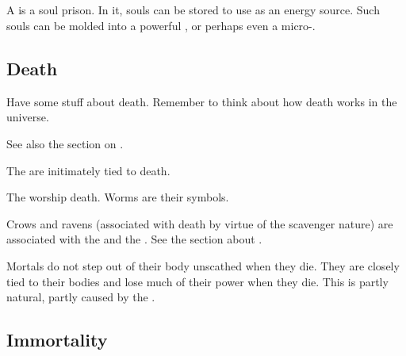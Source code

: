 \subsection{\Carcers}
\index{\carcer}
A \carcer{} is a soul prison. 
In it, souls can be stored to use as an energy source. 
Such souls can be molded into a powerful \vertex, or perhaps even a micro-\dweomer. 









\subsection{Death}
Have some stuff about death. Remember to think about how death works in the \Miith{} universe. 

See also the section on . 

The  are initimately tied to death. 

The  worship death. Worms are their symbols.

Crows and ravens (associated with death by virtue of the scavenger nature) are associated with the  and the \resphain. See the section about . 

Mortals do not step out of their body unscathed when they die. They are closely tied to their bodies and lose much of their power when they die. This is partly natural, partly caused by the . 










\subsection{Immortality}





